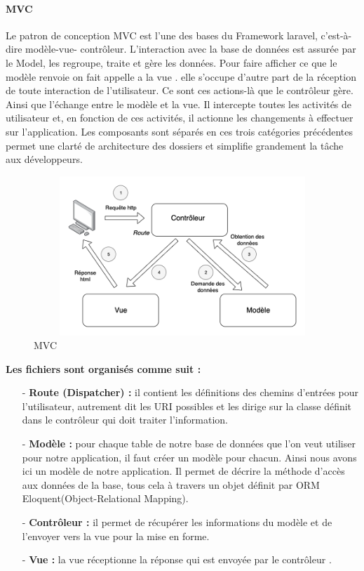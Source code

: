 \paragraph{MVC \newline}
Le patron de conception MVC est l’une des bases du Framework
laravel, c’est-à-dire modèle-vue- contrôleur. L’interaction avec la
base de données est assurée par le Model, les regroupe, traite et
gère les données.
Pour faire afficher ce que le modèle renvoie on fait appelle a la vue .
elle s’occupe d’autre part de la réception de toute interaction de
l’utilisateur. Ce sont ces actions-là que le contrôleur gère.
Ainsi que l’échange entre le modèle et la vue. Il intercepte toutes les
activités de utilisateur et, en fonction de ces activités, il actionne les
changements à effectuer sur l'application.
Les composants sont séparés en ces trois catégories précédentes
permet une clarté de architecture des dossiers et simplifie
grandement la tâche aux développeurs.
\begin{figure}[h!]
	\includegraphics[width=15cm, height=6cm]{./Template LaTeX/Images/Modèle-vue-contrôleur_(MVC)_-_fr.png}
	\caption{MVC}
	\label{fig:birds}
\end{figure}
\newline \newline \newline
\textbf{Les fichiers sont organisés comme suit :}
\begin{enumerate}
	\item [-] \textbf{Route (Dispatcher) : }il contient les définitions des chemins d’entrées pour l’utilisateur,
	autrement dit les URI possibles et les dirige sur la classe définit dans
	le contrôleur qui doit traiter l’information.
	\item [-] \textbf{ Modèle : }pour chaque table de notre base de données que l’on veut
	utiliser pour notre application, il faut créer un modèle pour chacun.
	Ainsi nous avons ici un modèle de notre application. Il permet de
	décrire la méthode d’accès aux données de la base, tous cela à
	travers un objet définit par ORM Eloquent(Object-Relational
	Mapping).
	\item [-] \textbf{Contrôleur : } il permet de récupérer les informations du modèle et de l’envoyer
	vers la vue pour la mise en forme.
	\item [-] \textbf{Vue : } la vue réceptionne la réponse qui est envoyée par le
	contrôleur .\newline
\end{enumerate}
